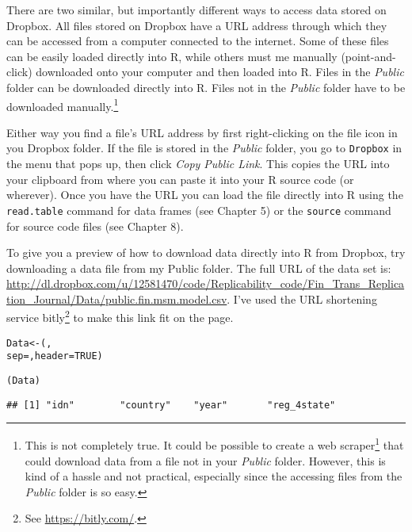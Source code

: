 There are two similar, but importantly different ways to access data stored on Dropbox. All files stored on Dropbox have a URL address through which they can be accessed from a computer connected to the internet. Some of these files can be easily loaded directly into R, while others must me manually (point-and-click) downloaded onto your computer and then loaded into R. Files in the \emph{Public} folder can be downloaded directly into R. Files not in the \emph{Public} folder have to be downloaded  manually.\footnote{This is not completely true. It could be possible to create a web scraper\footnote{web scraper} that could download data from a file not in your \emph{Public} folder. However, this is kind of a hassle and not practical, especially since the accessing files from the \emph{Public} folder is so easy.}

Either way you find a file's URL address by first right-clicking on the file icon in you Dropbox folder. If the file is stored in the \emph{Public} folder, you go to \texttt{Dropbox} in the menu that pops up, then click \emph{Copy Public Link}. This copies the URL into your clipboard from where you can paste it into your R source code (or wherever). Once you have the URL you can load the file directly into R using the \texttt{read.table} command for data frames (see Chapter 5) or the \texttt{source} command for source code files (see Chapter 8).

To give you a preview of how to download data directly into R from Dropbox, try downloading a data file from my Public folder. The full URL of the data set is: \url{http://dl.dropbox.com/u/12581470/code/Replicability_code/Fin_Trans_Replication_Journal/Data/public.fin.msm.model.csv}. I've used the URL shortening service bitly\footnote{See \url{https://bitly.com/}.}
to make this link fit on the page.

\begin{knitrout}
\color{fgcolor}\begin{kframe}
\begin{alltt}
Data <- (, 
                    sep = , header = TRUE)
                    
(Data)
\end{alltt}
\begin{verbatim}
## [1] "idn"        "country"    "year"       "reg_4state"
\end{verbatim}
\end{kframe}
\end{knitrout}


